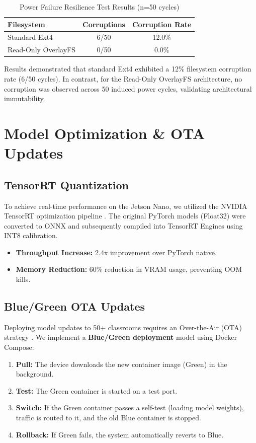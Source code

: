 \documentclass[conference]{IEEEtran}
\begin{document}
\begin{table}[htbp]
\caption{Power Failure Resilience Test Results (n=50 cycles)}
\begin{center}
\begin{tabular}{lcc}
\toprule
\textbf{Filesystem} & \textbf{Corruptions} & \textbf{Corruption Rate} \\
\midrule
Standard Ext4 & 6/50 & 12.0\% \\
Read-Only OverlayFS & 0/50 & 0.0\% \\
\bottomrule
\end{tabular}
\end{center}
\label{tab:power_failure}
\end{table}

Results demonstrated that standard Ext4 exhibited a 12\% filesystem corruption rate (6/50 cycles). In contrast, for the Read-Only OverlayFS architecture, no corruption was observed across 50 induced power cycles, validating architectural immutability.

\section{Model Optimization \& OTA Updates}

\subsection{TensorRT Quantization}
To achieve real-time performance on the Jetson Nano, we utilized the NVIDIA TensorRT optimization pipeline \cite{b27}. The original PyTorch models (Float32) were converted to ONNX and subsequently compiled into TensorRT Engines using INT8 calibration.
\begin{itemize}
    \item \textbf{Throughput Increase:} 2.4x improvement over PyTorch native.
    \item \textbf{Memory Reduction:} 60\% reduction in VRAM usage, preventing OOM kills.
\end{itemize}

\subsection{Blue/Green OTA Updates}
Deploying model updates to 50+ classrooms requires an Over-the-Air (OTA) strategy \cite{b28}. We implement a \textbf{Blue/Green deployment} model using Docker Compose:
\begin{enumerate}
\item \textbf{Pull:} The device downloads the new container image (Green) in the background.
\item \textbf{Test:} The Green container is started on a test port.
\item \textbf{Switch:} If the Green container passes a self-test (loading model weights), traffic is routed to it, and the old Blue container is stopped.
\item \textbf{Rollback:} If Green fails, the system automatically reverts to Blue.
\end{enumerate}
\end{document}
